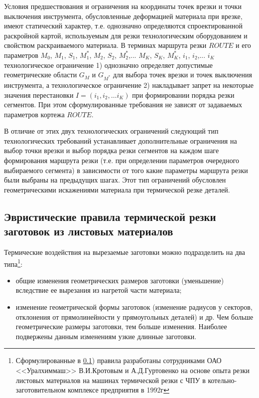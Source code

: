 \documentclass[11pt,twoside]{report}
\begin{document}
Условия предшествования и ограничения на координаты точек врезки
и точки выключения инструмента,
обусловленные деформацией материала при врезке,
имеют статический характер,
т.е. однозначно определяются спроектированной раскройной картой,
используемым для резки технологическим оборудованием
и свойством раскраиваемого материала.
В терминах маршрута резки $ROUTE$
и его параметров
$M_0$, $M_1$, $S_1$, $M_1^*$, $M_2$, $S_2$, $M_2^*$,... $M_K$, $S_K$, $M_K^*$,
$i_1$, $i_2$,... $i_K$
технологическое ограничение
1) однозначно определяет допустимые геометрические области
$G_M$
и
$G_{M^*}$
для выбора точек врезки и точек выключения инструмента,
а технологическое ограничение
2) накладывает запрет на некоторые значения перестановки
$ I = (i_1, i_2, \dots i_K)$
при формировании порядка резки сегментов. При
этом сформулированные требования не зависят от задаваемых параметров кортежа
$ROUTE$.

В отличие от этих двух технологических ограничений
следующий тип технологических требований устанавливает
дополнительные ограничения на выбор точки врезки и выбор
порядка резки сегментов на каждом шаге формирования маршрута резки
(т.е. при определении параметров очередного выбираемого сегмента)
в зависимости от того какие параметры маршрута резки были выбраны на предыдущих шагах.
Этот тип ограничений обусловлен геометрическими
искажениями материала при термической резке деталей.

\subsection{Эвристические правила термической резки заготовок из листовых материалов}
\label{Par133}

Термические воздействия на вырезаемые заготовки можно подразделить на два типа\footnote{
  Сформулированные в \ref{Par133})
  правила разработаны сотрудниками ОАО <<Уралхиммаш>>
  В.И.Кротовым и А.Д.Гуртовенко на основе опыта
  резки листовых материалов на машинах термической резки с ЧПУ
  в котельно-заготовительном комплексе предприятия в 1992г
}:

\begin{itemize}
\item общие изменения геометрических размеров заготовки (уменьшение)
вследствие ее вырезания из нагретой части материала;
\item	изменение геометрической формы заготовок
(изменение радиусов у секторов,
отклонения от прямолинейности у прямоугольных деталей) и др.
Чем больше геометрические размеры заготовки,
тем больше изменения.
Наиболее  подвержены данным изменениям узкие длинные заготовки.
\end{itemize}
\end{document}

